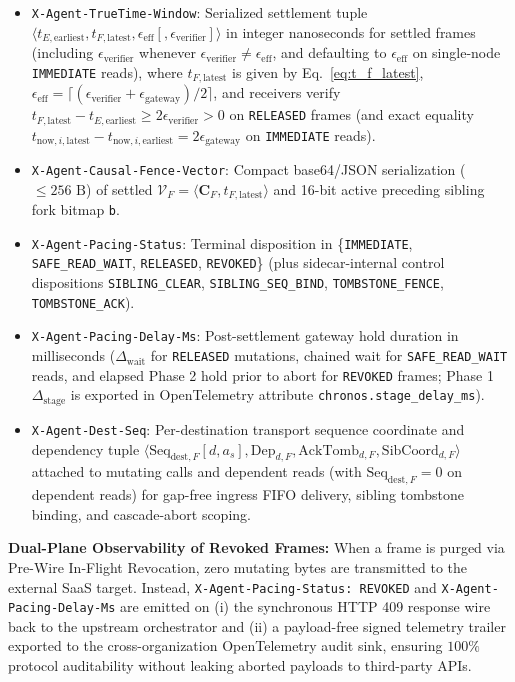 \documentclass[conference,10pt]{IEEEtran}
\begin{document}
\begin{itemize}
    \item \texttt{X-Agent-TrueTime-Window}: Serialized settlement tuple $\langle t_{E,\text{earliest}}, t_{F,\text{latest}}, \epsilon_{\text{eff}}[, \epsilon_{\text{verifier}}] \rangle$ in integer nanoseconds for settled frames (including $\epsilon_{\text{verifier}}$ whenever $\epsilon_{\text{verifier}} \ne \epsilon_{\text{eff}}$, and defaulting to $\epsilon_{\text{eff}}$ on single-node \texttt{IMMEDIATE} reads), where $t_{F,\text{latest}}$ is given by Eq.~\eqref{eq:t_f_latest}, $\epsilon_{\text{eff}} = \lceil (\epsilon_{\text{verifier}} + \epsilon_{\text{gateway}})/2 \rceil$, and receivers verify $t_{F,\text{latest}} - t_{E,\text{earliest}} \ge 2\epsilon_{\text{verifier}} > 0$ on \texttt{RELEASED} frames (and exact equality $t_{\text{now},i,\text{latest}} - t_{\text{now},i,\text{earliest}} = 2\epsilon_{\text{gateway}}$ on \texttt{IMMEDIATE} reads).
    \item \texttt{X-Agent-Causal-Fence-Vector}: Compact base64/JSON serialization ($\le 256\text{ B}$) of settled $\mathcal{V}_F = \langle \mathbf{C}_F, t_{F,\text{latest}} \rangle$ and 16-bit active preceding sibling fork bitmap \texttt{b}.
    \item \texttt{X-Agent-Pacing-Status}: Terminal disposition in \{\texttt{IMMEDIATE}, \texttt{SAFE\_READ\_WAIT}, \texttt{RELEASED}, \texttt{REVOKED}\} (plus sidecar-internal control dispositions \texttt{SIBLING\_CLEAR}, \texttt{SIBLING\_SEQ\_BIND}, \texttt{TOMBSTONE\_FENCE}, \texttt{TOMBSTONE\_ACK}).
    \item \texttt{X-Agent-Pacing-Delay-Ms}: Post-settlement gateway hold duration in milliseconds ($\Delta_{\text{wait}}$ for \texttt{RELEASED} mutations, chained wait for \texttt{SAFE\_READ\_WAIT} reads, and elapsed Phase 2 hold prior to abort for \texttt{REVOKED} frames; Phase 1 $\Delta_{\text{stage}}$ is exported in OpenTelemetry attribute \texttt{chronos.stage\_delay\_ms}).
    \item \texttt{X-Agent-Dest-Seq}: Per-destination transport sequence coordinate and dependency tuple $\langle \text{Seq}_{\text{dest},F}[d, a_s], \text{Dep}_{d,F}, \text{AckTomb}_{d,F}, \text{SibCoord}_{d,F} \rangle$ attached to mutating calls and dependent reads (with $\text{Seq}_{\text{dest},F} = 0$ on dependent reads) for gap-free ingress FIFO delivery, sibling tombstone binding, and cascade-abort scoping.
\end{itemize}

\textbf{Dual-Plane Observability of Revoked Frames:} When a frame is purged via Pre-Wire In-Flight Revocation, zero mutating bytes are transmitted to the external SaaS target. Instead, \texttt{X-Agent-Pacing-Status: REVOKED} and \texttt{X-Agent-Pacing-Delay-Ms} are emitted on (i) the synchronous HTTP 409 response wire back to the upstream orchestrator and (ii) a payload-free signed telemetry trailer exported to the cross-organization OpenTelemetry audit sink, ensuring $100\%$ protocol auditability without leaking aborted payloads to third-party APIs.
\end{document}
